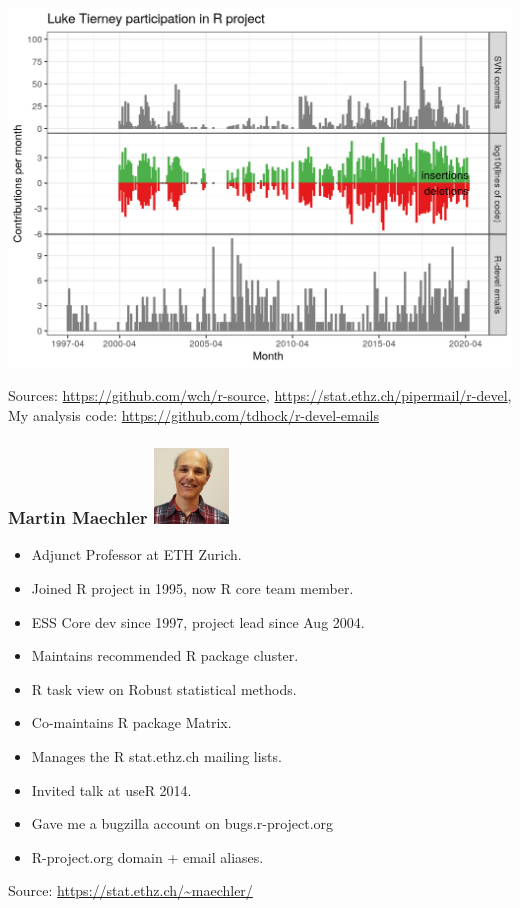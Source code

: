 \documentclass{beamer}
\begin{document}
\begin{frame}
  \includegraphics[width=\textwidth]{monthly_code_Luke_Tierney.png}

  Sources: \url{https://github.com/wch/r-source},
  \url{https://stat.ethz.ch/pipermail/r-devel}, My analysis code:
  \url{https://github.com/tdhock/r-devel-emails}
  
\end{frame}

\begin{frame}
  \frametitle{Martin Maechler \includegraphics[height=2cm]{photo_martin}}

  \begin{itemize}
  \item Adjunct Professor at ETH Zurich.
  \item Joined R project in 1995, now R core team member.
  \item ESS Core dev since 1997, project lead since Aug 2004.
  \item Maintains recommended R package cluster.
  \item R task view on Robust statistical methods.
  \item Co-maintains R package Matrix.
  \item Manages the R stat.ethz.ch mailing lists.
  \item Invited talk at useR 2014.
  \item Gave me a bugzilla account on bugs.r-project.org
  \item R-project.org domain + email aliases.
  \end{itemize}

  Source: \url{https://stat.ethz.ch/~maechler/}
  
\end{frame}
\end{document}

